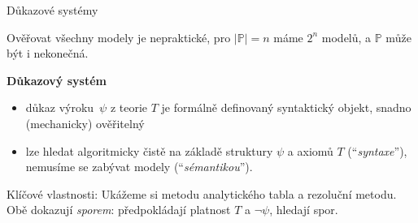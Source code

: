 \documentclass{beamer}
\begin{document}
\begin{frame}{Důkazové systémy}

    Ověřovat všechny modely je nepraktické, pro $|\mathbb P|=n$ máme $2^n$ modelů, a $\mathbb P$ může být i nekonečná.

    \textbf{Důkazový systém}
    \begin{itemize}
        \item \alert{důkaz} výroku~\( \psi \) z teorie \(T\) je formálně definovaný syntaktický objekt, snadno (mechanicky) ověřitelný
        \item lze hledat algoritmicky čistě na základě struktury \( \psi \) a axiomů \(T\) (``\emph{syntaxe}''), nemusíme se zabývat modely (``\emph{sémantikou}'').
    \end{itemize}        
    Klíčové vlastnosti: 
    Ukážeme si \alert{metodu analytického tabla} a \alert{rezoluční metodu}. Obě dokazují \emph{sporem}: předpokládají platnost $T$ a \( \neg \psi \), hledají spor.

\end{frame}

\end{document}
